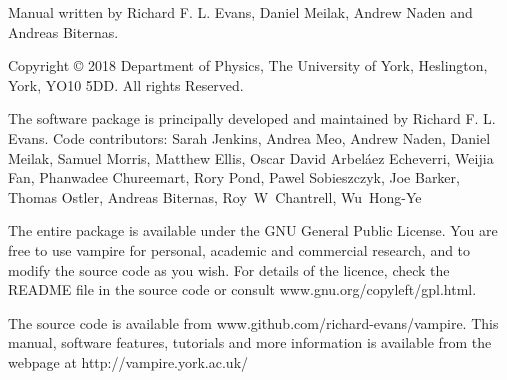 \noindent Manual written by Richard F. L. Evans, Daniel Meilak, Andrew Naden and Andreas Biternas.\\
\par
\noindent Copyright \copyright \xspace 2018 Department of Physics, The University of York, Heslington, York, YO10 5DD. All rights Reserved.\\
\par
\noindent The \vampire software package is principally developed and maintained by Richard F. L. Evans. Code contributors: Sarah Jenkins, Andrea Meo, Andrew Naden, Daniel Meilak, Samuel Morris, Matthew Ellis, Oscar David Arbel\'aez Echeverri, Weijia Fan, Phanwadee Chureemart, Rory Pond, Pawel Sobieszczyk, Joe Barker, Thomas Ostler, Andreas Biternas, Roy~W~Chantrell, Wu~Hong-Ye\\
\par
\noindent The entire \vampire package is available under the GNU General Public License. You are free to use vampire for personal, academic and commercial research, and to modify the source code as you wish. For details of the licence, check the README file in the source code or consult www.gnu.org/copyleft/gpl.html.\\
\par
\noindent The \vampire source code is available from www.github.com/richard-evans/vampire. This manual, software features, tutorials and more information is available from the \vampire webpage at http://vampire.york.ac.uk/\\
